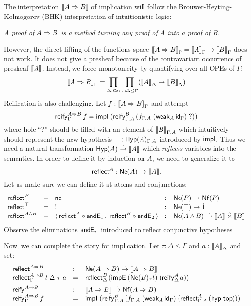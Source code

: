 \documentclass[a4paper]{article}
\begin{document}
The interpretation $\den{A \imp B}$ of implication will follow the
Brouwer-Heyting-Kolmogorov (BHK) interpretation of intuitionistic
logic:
\begin{center}\itshape
  A proof of $A \imp B$ is a method turning any proof of $A$ into a
  proof of $B$.
\end{center}
However, the direct lifting of the functions space $\den{A \imp
  B}_\Gamma = \den A_\Gamma \to \den B_\Gamma$ does not work.  It does
not give a presheaf because of the contravariant occurrence of
presheaf $\den A$.  Instead, we force monotonicity by quantifying over
all OPEs of $\Gamma$:
\[
  \den{A \imp B}_\Gamma = \prod_{\Delta : \Cxt} \prod_{\tau : \Delta \leq \Gamma} (\den A
  _\Delta \to \den B _\Delta)
\]
Reification is also challenging.  Let $f : \den{A \imp B}_\Gamma$ and
attempt
\[
  \reify[\Gamma]{A \imp B} f %
    = \impIP {\reify[\Gamma.A]B{(f_{\Gamma.A}\;(\weak[A]{\id[\Gamma]})}\;\mbox{?})}
\]
where hole ``?'' should be filled with an element of $\den B_{\Gamma.A}$
which intuitively should represent the new hypothesis $\top :
\Hyp[\Gamma.A]A$ introduced by $\timpI$.  Thus we need a natural
transformation $\Hyp A \todot \den A$ which \emph{reflects} variables
into the semantics.  In order to define it by
induction on $A$, we need to generalize it to
\[
  \treflect^A : \Ne A \todot \den A
  .
\]
Let us make sure we can define it at atoms and conjunctions:
\[
\begin{array}{lllll}
  \treflect^P & = & \tne & : & \Ne P \todot \Nf P \\
  \treflect^\top & = & !  & : & \Ne \top \todot \hatone \\
  \treflect^{A \land B} & = & \langle\, \treflect^A \comp \andE1  , \;
                             \treflect^B \comp \andE2 \rangle
    & : & \Ne{A \land B} \todot \den A \hattimes \den B \\
\end{array}
\]
Observe the eliminations $\andE i$ introduced to reflect conjunctive hypotheses!

Now, we can complete the story for implication.  Let $\tau : \Delta
\leq \Gamma$ and $a : \den A_\Delta$ and set:
\[
\begin{array}{lll}
  \treflect^{A \imp B} & : & \Ne{A \imp B} \todot \den{A \imp B} \\
  \reflect[\Gamma]{A \imp B} t\;\Delta\;\tau\;a & = &
    \reflect[\Delta]B{(\impEP {\Ne[\tau] B t} {(\reify[\Delta] A a)})}
\\[1ex]
  \treify^{A \imp B} & : & \den{A \imp B} \todot \Nf{A \imp B} \\
  \reify[\Gamma]{A \imp B} f & = &
    \impIP {\reify[\Gamma.A]B{(f_{\Gamma.A}\;(\weak[A]{\id[\Gamma]})}\;(\reflect[\Gamma.A]A{(\hyp\ttop)})}
\end{array}
\]
\end{document}
